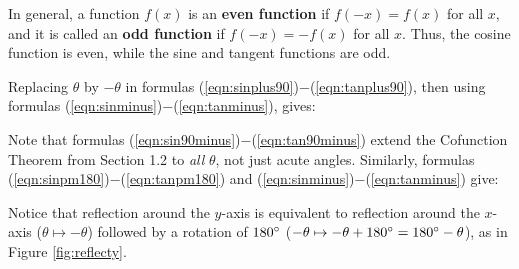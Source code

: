 In general, a function $f(x)$ is an \textbf{even function} if $f(-x) = f(x)$
for all $x$, and it is called an \textbf{odd function} if $f(-x) = -f(x)$ for
all $x$. Thus, the cosine function is even, while the sine and tangent functions are odd.

Replacing $\theta$ by $-\theta$ in formulas (\ref{eqn:sinplus90})$-$(\ref{eqn:tanplus90}), then
using formulas (\ref{eqn:sinminus})$-$(\ref{eqn:tanminus}), gives:

\begin{center}\statecomment[0.6\textwidth]{\begin{equation}\label{eqn:sin90minus}
 \sin\;(90\Degrees - \theta) ~ = ~ \cos\;\theta
\end{equation}
\begin{equation}\label{eqn:cos90minus}
 \cos\;(90\Degrees - \theta) ~ = ~ \sin\;\theta
\end{equation}
\begin{equation}\label{eqn:tan90minus}
 \tan\;(90\Degrees - \theta) ~ = ~ \cot\;\theta
\end{equation}}\end{center}
Note that formulas (\ref{eqn:sin90minus})$-$(\ref{eqn:tan90minus}) extend the Cofunction Theorem
from Section 1.2 to \emph{all} $\theta$, not just acute angles. Similarly, formulas
(\ref{eqn:sinpm180})$-$(\ref{eqn:tanpm180}) and (\ref{eqn:sinminus})$-$(\ref{eqn:tanminus})
give:

\begin{center}\statecomment[0.6\textwidth]{\begin{equation}\label{eqn:sin180minus}
 \sin\;(180\Degrees - \theta) ~ = ~ \sin\;\theta\phantom{-}
\end{equation}
\begin{equation}\label{eqn:cos180minus}
 \cos\;(180\Degrees - \theta) ~ = ~ -\cos\;\theta
\end{equation}
\begin{equation}\label{eqn:tan180minus}
 \tan\;(180\Degrees - \theta) ~ = ~ -\tan\;\theta
\end{equation}}\end{center}
\newpage
Notice that reflection around the $y$-axis is equivalent to reflection around the $x$-axis
($\theta \mapsto -\theta$) followed by a rotation of $180^\circ$ ($-\theta \mapsto
-\theta + 180^\circ = 180^\circ - \theta$), as in Figure \ref{fig:reflecty}.

